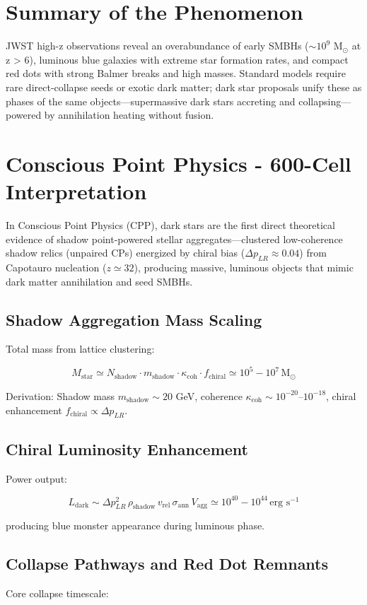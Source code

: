 \documentclass[11pt]{article}
\begin{document}
\section{Summary of the Phenomenon}
JWST high-z observations reveal an overabundance of early SMBHs ($\sim 10^9$ M$_\odot$ at z > 6), luminous blue galaxies with extreme star formation rates, and compact red dots with strong Balmer breaks and high masses. Standard models require rare direct-collapse seeds or exotic dark matter; dark star proposals unify these as phases of the same objects—supermassive dark stars accreting and collapsing—powered by annihilation heating without fusion.

\section{Conscious Point Physics - 600-Cell Interpretation}
In Conscious Point Physics (CPP), dark stars are the first direct theoretical evidence of shadow point-powered stellar aggregates—clustered low-coherence shadow relics (unpaired CPs) energized by chiral bias ($\Delta p_{LR} \approx 0.04$) from Capotauro nucleation ($z \simeq 32$), producing massive, luminous objects that mimic dark matter annihilation and seed SMBHs.

\subsection{Shadow Aggregation Mass Scaling}
Total mass from lattice clustering:

\[
M_{\text{star}} \simeq N_{\text{shadow}} \cdot m_{\text{shadow}} \cdot \kappa_{\text{coh}} \cdot f_{\text{chiral}} \simeq 10^5 - 10^7 \, \text{M}_\odot
\]

Derivation: Shadow mass $m_{\text{shadow}} \sim 20$ GeV, coherence $\kappa_{\text{coh}} \sim 10^{-20}$--$10^{-18}$, chiral enhancement $f_{\text{chiral}} \propto \Delta p_{LR}$.

\subsection{Chiral Luminosity Enhancement}
Power output:

\[
L_{\text{dark}} \sim \Delta p_{LR}^2 \, \rho_{\text{shadow}} \, v_{\text{rel}} \, \sigma_{\text{ann}} \, V_{\text{agg}} \simeq 10^{40} - 10^{44} \, \text{erg s}^{-1}
\]

producing blue monster appearance during luminous phase.

\subsection{Collapse Pathways and Red Dot Remnants}
Core collapse timescale:
\end{document}
